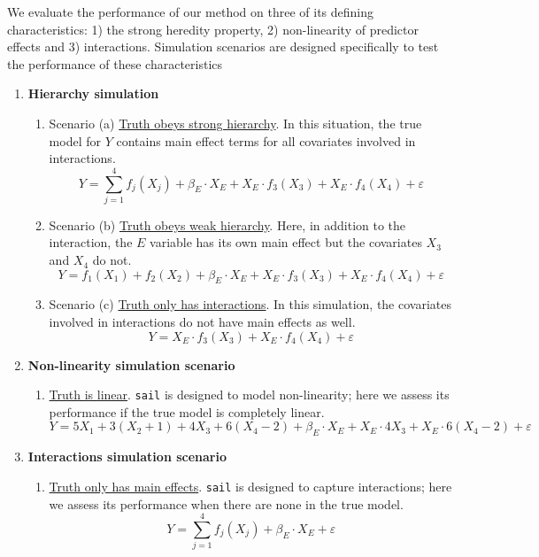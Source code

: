 We evaluate the performance of our method on three of its defining characteristics: 1) the strong heredity property, 2) non-linearity of predictor effects and 3) interactions. Simulation scenarios are designed specifically to test the performance of these characteristics


\begin{enumerate}
	\item \textbf{Hierarchy simulation}
	\begin{enumerate}
		\item[] Scenario (a) \underline{Truth obeys strong hierarchy}. In this situation, the true model for $Y$ contains main effect terms for all covariates involved in interactions. \[Y = \sum_{j=1}^{4} f_j(X_{j}) + \beta_E \cdot X_{E} +  X_{E} \cdot f_3(X_{3}) + X_{E} \cdot f_4(X_{4}) + \varepsilon\]
		\item[] Scenario (b) \underline{Truth obeys weak hierarchy}. Here, in addition to the interaction, the $E$ variable has its own main effect but the covariates $X_3$ and $X_4$ do not.
		\[Y = f_1(X_{1}) + f_2(X_{2}) + \beta_E \cdot X_{E} +  X_{E} \cdot f_3(X_{3}) + X_{E} \cdot f_4(X_{4}) + \varepsilon\]
		\item[] Scenario (c) \underline{Truth only has interactions}. In this simulation, the covariates involved in interactions do not have main effects as well.  \[Y =  X_{E} \cdot f_3(X_{3}) + X_{E} \cdot f_4(X_{4}) + \varepsilon\]
	\end{enumerate}
	
	\item \textbf{Non-linearity simulation scenario}
	\begin{enumerate}
		\item[] \underline{Truth is linear}. \texttt{sail} is designed to model non-linearity; here we assess its performance if the true model is completely linear. \[Y = 5X_1 + 3(X_2 + 1) + 4X_3 + 6(X_4-2) + \beta_E \cdot X_{E} +  X_{E} \cdot 4X_3 + X_{E} \cdot 6(X_4-2) + \varepsilon\]
	\end{enumerate}
	
	\item \textbf{Interactions simulation scenario}
	\begin{enumerate}
		
		\item[] \underline{Truth only has main effects}. \texttt{sail} is designed to capture interactions; here we assess its performance when there are none in the true model. \[Y = \sum_{j=1}^{4} f_j(X_{j}) + \beta_E \cdot X_{E} + \varepsilon\]
	\end{enumerate}
	
	
\end{enumerate}

